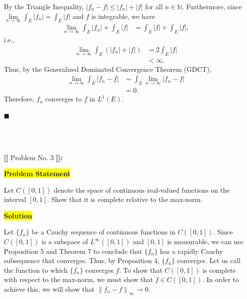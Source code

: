 \documentclass[12pt]{article}
\newcommand\norm[1]{\left\lVert#1\right\rVert}
\newcommand{\mybox}{%
    \collectbox{%
        \setlength{\fboxsep}{2pt}%
        \fbox{\BOXCONTENT}%
    }%
}
\begin{document}
\noindent By the Triangle Inequality, $|f_n - f| \leq |f_n| + |f|$ for all $n\in\mathbb{N}$. Furthermore, since $\lim\limits_{n\rightarrow\infty}\int_E |f_n| = \int_E |f|$ and $f$ is integrable, we have 
\begin{align}
    \lim\limits_{n\rightarrow\infty}\int_E |f_n| + \int_E |f| &= \int_E |f| + \int_E |f|,
\end{align}
i.e.,
\begin{align}
    \lim\limits_{n\rightarrow\infty}\int_E \left(|f_n| + |f|\right) &= 2\int_E |f| \\
    & < \infty.
\end{align}
Thus, by the Generalized Dominated Convergence Theorem (GDCT), 
\begin{align}
    \lim\limits_{n\rightarrow\infty}\int_{E} |f_n - f| &= \int_{E} \lim\limits_{n\rightarrow\infty} |f_n-f| \\
    &= 0.
\end{align}
Therefore, $f_n$ converges to $f$ in $L^1(E)$.

\hfill$\blacksquare$

\vfill

\begin{center}
\\
\vspace{2mm}
\vspace{-0.65cm}
\hrulefill \\
\vspace{-0.95cm}
\hrulefill
\end{center}

\pagebreak

\noindent \textbf{{\huge [}{\Large [}} Problem No. 3 \textbf{{\Large ]}{\huge ]}}{\Large \textbf{:}}

\vspace{3mm}

\noindent\mybox{\colorbox{yellow}{\textbf{Problem Statement}}}\hspace{3mm}\hrulefill 

\noindent Let $C([0,1])$ denote the space of continuous real-valued functions on the interval $[0,1]$. Show that it is complete relative to the max-norm.

\vspace{5mm}

\noindent\mybox{\colorbox{yellow}{\textbf{Solution}}}\hspace{3mm}\hrulefill

\noindent Let $\lbrace f_n \rbrace$ be a Cauchy sequence of continuous functions in $C([0,1])$. Since $C([0,1])$ is a subspace of $L^{\infty}([0,1])$ and $[0,1]$ is measurable, we can use Proposition 5 and Theorem 7 to conclude that $\lbrace f_n\rbrace$ has a rapidly Cauchy subsequence that converges. Thus, by Proposition 4, $\lbrace f_n \rbrace$ converges. Let us call the function to which $\lbrace f_n \rbrace$ converges $f$. To show that $C([0,1])$ is complete with respect to the max-norm, we must show that $f\in C([0,1])$. In order to achieve this, we will show that $\norm{f_n-f}_{\infty} \rightarrow 0$. 
\end{document}
